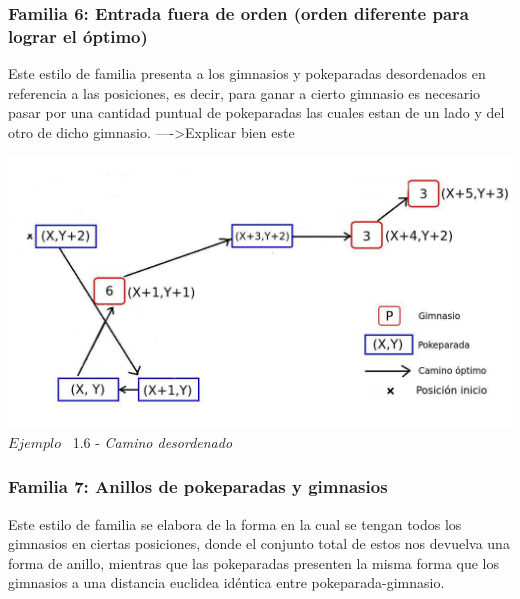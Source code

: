 \begin{center}
  \subsubsection*{Familia 6: Entrada fuera de orden (orden diferente para lograr el óptimo)}
\end{center}

Este estilo de familia presenta a los gimnasios y pokeparadas desordenados en referencia a las posiciones, es decir, para ganar a cierto gimnasio es necesario pasar por una cantidad puntual de pokeparadas las cuales estan de un lado y del otro de dicho gimnasio.
---->Explicar bien este

\vspace*{0.3cm} \vspace*{0.3cm}
  \begin{center}
 \includegraphics[scale=0.6]{./EJ1/desorden.jpeg}
\\ {$Ejemplo$ \ 1.6 - \textit{Camino desordenado}}
  \end{center}
  \vspace*{0.3cm}

\begin{center}
  \subsubsection*{Familia 7: Anillos de pokeparadas y gimnasios}
\end{center}

Este estilo de familia se elabora de la forma en la cual se tengan todos los gimnasios en ciertas posiciones, donde el conjunto total de estos nos devuelva una forma de anillo, mientras que las pokeparadas presenten la misma forma que los gimnasios a una distancia euclidea id\'entica entre pokeparada-gimnasio.\\

